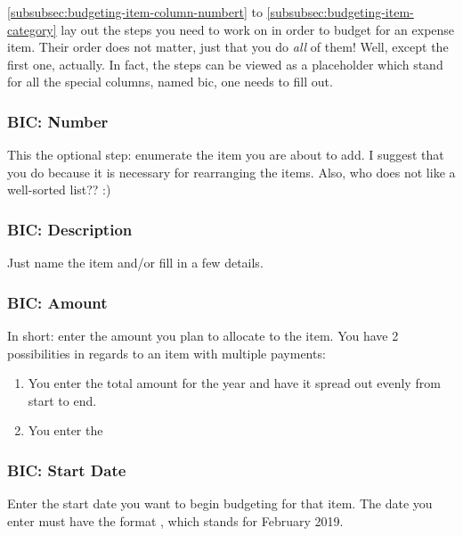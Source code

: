 \autoref{subsubsec:budgeting-item-column-numbert} to \autoref{subsubsec:budgeting-item-category} lay out the steps you need to work on in order to budget for an expense item.
Their order does not matter, just that you do \emph{all} of them!
Well, except the first one, actually.
In fact, the steps can be viewed as a placeholder which stand for all the special columns, named \ac{bic}, one needs to fill out.



\subsubsection{BIC: Number}
\label{subsubsec:budgeting-item-column-number}

This the optional step: enumerate the item you are about to add.
I suggest that you do because it is necessary for rearranging the items.
Also, who does not like a well-sorted list?? :)

\subsubsection{BIC: Description}
\label{subsubsec:budgeting-item-column-description}

Just name the item and/or fill in a few details.

\subsubsection{BIC: Amount}
\label{subsubsec:budgeting-item-column-amount}

In short: enter the amount you plan to allocate to the item.
You have 2 possibilities in regards to an item with multiple payments:
\begin{enumerate}
	\item You enter the total amount for the year and have it spread out evenly from start to end.
	\item You enter the 
\end{enumerate}

\subsubsection{BIC: Start Date}
\label{subsubsec:budgeting-item-column-start-date}

Enter the start date you want to begin budgeting for that item.
The date you enter must have the format , \eg {} which stands for February 2019.

